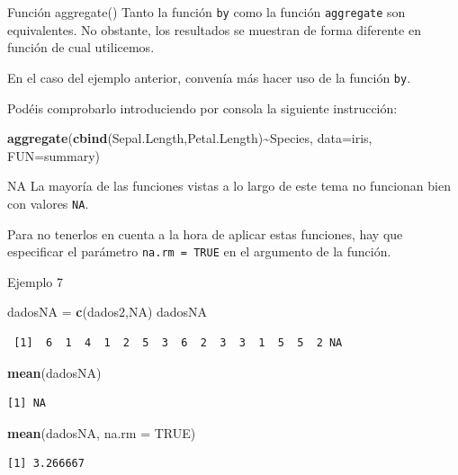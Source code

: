 \documentclass[
  ignorenonframetext,
  aspectratio=169]{beamer}
\newenvironment{Shaded}{\begin{snugshade}}{\end{snugshade}}
\newcommand{\AttributeTok}[1]{\textcolor[rgb]{0.13,0.29,0.53}{#1}}
\newcommand{\ConstantTok}[1]{\textcolor[rgb]{0.56,0.35,0.01}{#1}}
\newcommand{\FunctionTok}[1]{\textcolor[rgb]{0.13,0.29,0.53}{\textbf{#1}}}
\newcommand{\NormalTok}[1]{#1}
\newcommand{\OtherTok}[1]{\textcolor[rgb]{0.56,0.35,0.01}{#1}}
\newcommand{\SpecialCharTok}[1]{\textcolor[rgb]{0.81,0.36,0.00}{\textbf{#1}}}
\begin{document}
\begin{frame}[fragile]{Función aggregate()}
\label{funciuxf3n-aggregate}
Tanto la función \texttt{by} como la función \texttt{aggregate} son
equivalentes. No obstante, los resultados se muestran de forma diferente
en función de cual utilicemos.

En el caso del ejemplo anterior, convenía más hacer uso de la función
\texttt{by}.

Podéis comprobarlo introduciendo por consola la siguiente instrucción:

\begin{Shaded}
\begin{Highlighting}[]
\FunctionTok{aggregate}\NormalTok{(}\FunctionTok{cbind}\NormalTok{(Sepal.Length,Petal.Length)}\SpecialCharTok{\textasciitilde{}}\NormalTok{Species, }\AttributeTok{data=}\NormalTok{iris, }\AttributeTok{FUN=}\NormalTok{summary)}
\end{Highlighting}
\end{Shaded}
\end{frame}

\begin{frame}[fragile]{NA}
\label{na}
La mayoría de las funciones vistas a lo largo de este tema no funcionan
bien con valores \texttt{NA}.

Para no tenerlos en cuenta a la hora de aplicar estas funciones, hay que
especificar el parámetro \texttt{na.rm\ =\ TRUE} en el argumento de la
función.
\end{frame}

\begin{frame}[fragile]{Ejemplo 7}
\label{ejemplo-7}
\begin{Shaded}
\begin{Highlighting}[]
\NormalTok{dadosNA }\OtherTok{=} \FunctionTok{c}\NormalTok{(dados2,}\ConstantTok{NA}\NormalTok{)}
\NormalTok{dadosNA}
\end{Highlighting}
\end{Shaded}

\begin{verbatim}
 [1]  6  1  4  1  2  5  3  6  2  3  3  1  5  5  2 NA
\end{verbatim}

\begin{Shaded}
\begin{Highlighting}[]
\FunctionTok{mean}\NormalTok{(dadosNA)}
\end{Highlighting}
\end{Shaded}

\begin{verbatim}
[1] NA
\end{verbatim}

\begin{Shaded}
\begin{Highlighting}[]
\FunctionTok{mean}\NormalTok{(dadosNA, }\AttributeTok{na.rm =} \ConstantTok{TRUE}\NormalTok{)}
\end{Highlighting}
\end{Shaded}

\begin{verbatim}
[1] 3.266667
\end{verbatim}
\end{frame}
\end{document}

